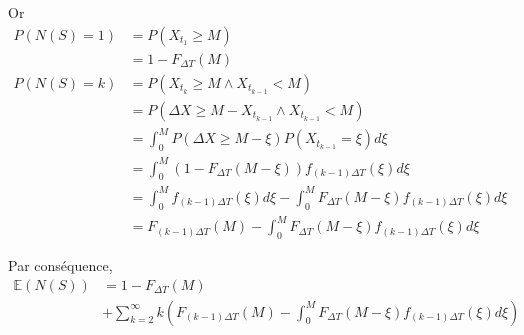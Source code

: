 \documentclass[10pt,a4paper]{article}
\begin{document}
Or
\begin{align*}
    P\left( {N\left( S \right) = 1} \right) & = P\left( {{X_{{t_1}}} \geqslant M} \right) \\
    & = 1 - {F_{\Delta T}}\left( M \right) \\
    P\left( {N\left( S \right) = k} \right) & = P\left( {{X_{{t_k}}} \geqslant M \wedge {X_{{t_{k - 1}}}} < M} \right) \\
    & = P\left( {\Delta X \geqslant M - {X_{{t_{k - 1}}}} \wedge {X_{{t_{k - 1}}}} < M} \right) \\
    & = \int_0^M {P\left( {\Delta X \geqslant M - \xi } \right)P\left( {{X_{{t_{k - 1}}}} = \xi } \right)d\xi }\\
    & = \int_0^M {\left( {1 - {F_{\Delta T}}\left( {M - \xi } \right)} \right){f_{\left( {k - 1} \right)\Delta T}}\left( \xi  \right)d\xi } \\
    & = \int_0^M {{f_{\left( {k - 1} \right)\Delta T}}\left( \xi  \right)d\xi }  - \int_0^M {{F_{\Delta T}}\left( {M - \xi } \right){f_{\left( {k - 1} \right)\Delta T}}\left( \xi  \right)d\xi } \\
    & = {F_{\left( {k - 1} \right)\Delta T}}\left( M \right) - \int_0^M {{F_{\Delta T}}\left( {M - \xi } \right){f_{\left( {k - 1} \right)\Delta T}}\left( \xi  \right)d\xi }
\end{align*}

Par conséquence, 
\begin{align}
    \label{e_n_s_de}
    \mathbb{E}\left( {N\left( S \right)} \right) & = 1 - {F_{\Delta T}}\left( M \right) \nonumber \\
    & + \sum\limits_{k = 2}^\infty  {k\left( {{F_{\left( {k - 1} \right)\Delta T}}\left( M \right) - \int_0^M {{F_{\Delta T}}\left( {M - \xi } \right){f_{\left( {k - 1} \right)\Delta T}}\left( \xi  \right)d\xi } } \right)}
\end{align}
\end{document}
